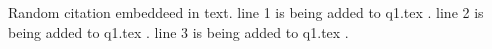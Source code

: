 \documentclass{article}
\begin{document}
Random citation \cite{DUMMY:1} embeddeed in text.
line 1 is being added to q1.tex .\linebreak
line 2 is being added to q1.tex .\linebreak
line 3 is being added to q1.tex .\linebreak

\newpage

 

\end{document}
